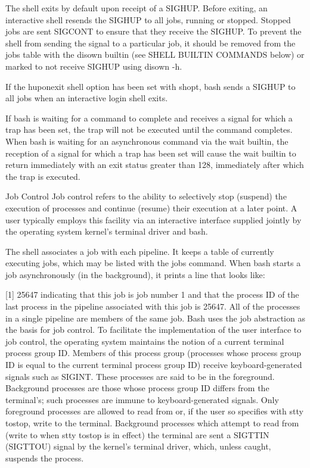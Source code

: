 \documentclass[11pt]{article}
\begin{document}
{{{The shell exits by default upon receipt of a SIGHUP. Before exiting, an interactive shell resends the SIGHUP to all jobs, running or stopped. Stopped jobs are sent SIGCONT to ensure that they receive the SIGHUP. To prevent the shell from sending the signal to a particular job, it should be removed from the jobs table with the disown builtin (see SHELL BUILTIN COMMANDS below) or marked to not receive SIGHUP using disown -h.

If the huponexit shell option has been set with shopt, bash sends a SIGHUP to all jobs when an interactive login shell exits.

If bash is waiting for a command to complete and receives a signal for which a trap has been set, the trap will not be executed until the command completes. When bash is waiting for an asynchronous command via the wait builtin, the reception of a signal for which a trap has been set will cause the wait builtin to return immediately with an exit status greater than 128, immediately after which the trap is executed.

Job Control
Job control refers to the ability to selectively stop (suspend) the execution of processes and continue (resume) their execution at a later point. A user typically employs this facility via an interactive interface supplied jointly by the operating system kernel's terminal driver and bash.

The shell associates a job with each pipeline. It keeps a table of currently executing jobs, which may be listed with the jobs command. When bash starts a job asynchronously (in the background), it prints a line that looks like:

[1] 25647
indicating that this job is job number 1 and that the process ID of the last process in the pipeline associated with this job is 25647. All of the processes in a single pipeline are members of the same job. Bash uses the job abstraction as the basis for job control.
To facilitate the implementation of the user interface to job control, the operating system maintains the notion of a current terminal process group ID. Members of this process group (processes whose process group ID is equal to the current terminal process group ID) receive keyboard-generated signals such as SIGINT. These processes are said to be in the foreground. Background processes are those whose process group ID differs from the terminal's; such processes are immune to keyboard-generated signals. Only foreground processes are allowed to read from or, if the user so specifies with stty tostop, write to the terminal. Background processes which attempt to read from (write to when stty tostop is in effect) the terminal are sent a SIGTTIN (SIGTTOU) signal by the kernel's terminal driver, which, unless caught, suspends the process.

}}}
\end{document}

